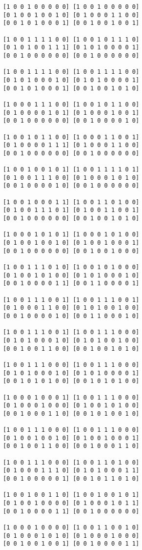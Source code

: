 \begin{lstlisting}
[1 0 0 1 0 0 0 0 0] [1 0 0 1 0 0 0 0 0] 
[0 1 0 0 1 0 0 1 0] [0 1 0 0 0 1 1 0 0] 
[0 0 1 0 1 0 0 0 1] [0 0 1 0 0 1 0 0 1] 

[1 0 0 1 1 1 1 0 0] [1 0 0 1 0 1 1 1 0] 
[0 1 0 1 0 0 1 1 1] [0 1 0 1 0 0 0 0 1] 
[0 0 1 0 0 0 0 0 0] [0 0 1 0 0 0 0 0 0] 

[1 0 0 1 1 1 1 0 0] [1 0 0 1 1 1 1 0 0] 
[0 1 0 1 0 0 0 1 0] [0 1 0 1 0 0 0 0 1] 
[0 0 1 0 1 0 0 0 1] [0 0 1 0 0 1 0 1 0] 

[1 0 0 0 1 1 1 0 0] [1 0 0 1 0 1 1 0 0] 
[0 1 0 0 0 0 1 0 1] [0 1 0 0 0 1 0 0 1] 
[0 0 1 0 0 0 0 0 0] [0 0 1 0 0 0 0 1 0] 

[1 0 0 1 0 1 1 0 0] [1 0 0 0 1 1 0 0 1] 
[0 1 0 0 0 0 1 1 1] [0 1 0 0 0 1 1 0 0] 
[0 0 1 0 0 0 0 0 0] [0 0 1 0 0 0 0 0 0] 

[1 0 0 1 0 0 1 0 1] [1 0 0 1 1 1 1 0 1] 
[0 1 0 0 1 1 1 0 0] [0 1 0 0 0 1 0 1 0] 
[0 0 1 0 0 0 0 1 0] [0 0 1 0 0 0 0 0 0] 

[1 0 0 1 0 0 0 1 1] [1 0 0 1 1 0 1 0 0] 
[0 1 0 0 1 1 1 0 1] [0 1 0 0 1 1 0 0 1] 
[0 0 1 0 0 0 0 0 0] [0 0 1 0 0 1 0 1 0] 

[1 0 0 0 1 0 1 0 1] [1 0 0 0 1 0 1 0 0] 
[0 1 0 0 1 0 0 1 0] [0 1 0 0 1 0 0 0 1] 
[0 0 1 0 0 0 0 0 0] [0 0 1 0 0 1 0 0 0] 

[1 0 0 1 1 1 0 1 0] [1 0 0 1 0 1 0 0 0] 
[0 1 0 0 1 0 1 0 0] [0 1 0 1 0 0 0 1 0] 
[0 0 1 0 0 0 0 1 1] [0 0 1 1 0 0 0 0 1] 

[1 0 0 1 1 1 0 0 1] [1 0 0 1 1 1 0 0 1] 
[0 1 0 0 0 1 1 0 0] [0 1 0 1 0 0 1 0 0] 
[0 0 1 0 0 0 0 1 0] [0 0 1 1 0 0 0 1 0] 

[1 0 0 1 1 1 0 0 1] [1 0 0 1 1 1 0 0 0] 
[0 1 0 1 0 0 0 1 0] [0 1 0 1 0 0 1 0 0] 
[0 0 1 0 0 1 1 0 0] [0 0 1 0 0 1 0 1 0] 

[1 0 0 1 1 1 0 0 0] [1 0 0 1 1 1 0 0 0] 
[0 1 0 1 0 0 0 1 0] [0 1 0 1 0 0 0 0 1] 
[0 0 1 0 1 0 1 0 0] [0 0 1 0 1 0 1 0 0] 

[1 0 0 0 1 0 0 0 1] [1 0 0 1 1 1 0 0 0] 
[0 1 0 0 0 1 0 0 0] [0 1 0 0 1 0 1 0 0] 
[0 0 1 0 0 0 1 1 0] [0 0 1 0 1 0 0 1 0] 

[1 0 0 1 1 1 0 0 0] [1 0 0 1 1 1 0 0 0] 
[0 1 0 0 1 0 0 1 0] [0 1 0 0 1 0 0 0 1] 
[0 0 1 0 0 1 1 0 0] [0 0 1 0 0 0 1 1 0] 

[1 0 0 1 1 1 0 0 0] [1 0 0 1 1 0 1 0 0] 
[0 1 0 0 0 1 1 1 0] [0 1 0 1 0 0 0 1 1] 
[0 0 1 0 0 0 0 0 1] [0 0 1 0 1 1 0 1 0] 

[1 0 0 1 0 0 1 1 0] [1 0 0 1 0 0 1 0 1] 
[0 1 0 0 1 0 0 0 0] [0 1 0 0 0 1 0 1 1] 
[0 0 1 0 0 0 0 1 1] [0 0 1 0 0 0 0 0 0] 

[1 0 0 0 1 0 0 0 0] [1 0 0 1 1 0 0 1 0] 
[0 1 0 0 0 1 0 1 0] [0 1 0 0 0 1 0 0 0] 
[0 0 1 0 0 1 0 0 1] [0 0 1 0 0 0 0 1 1] 
\end{lstlisting}

\clearpage